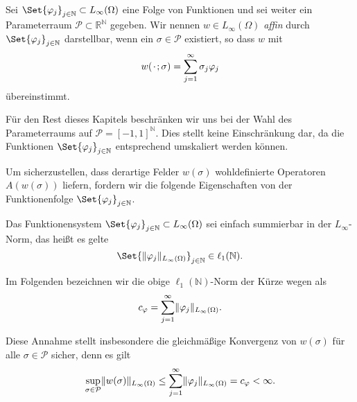 \begin{Definition}
\label{def:ps:pf:omega_affin}
    Sei $\Set{\varphi_{j}}_{j \in \mathbb{N}} \subset L_{\infty}(\Omega)$ eine Folge von Funktionen und sei weiter ein Parameterraum $\mathcal P \subset \mathbb{R}^{\mathbb{N}}$ gegeben.
    Wir nennen $w \in L_{\infty}(\Omega)$ \emph{affin} durch $\Set{\varphi_{j}}_{j \in \mathbb{N}}$ darstellbar, wenn ein $\sigma \in \mathcal P$ existiert, so dass $w$ mit
    \begin{equation}
        w({\mkern2mu\cdot\mkern2mu}; \sigma) = \sum_{j = 1}^{\infty} \sigma_{j} \varphi_{j}
    \end{equation}
    übereinstimmt.
\end{Definition}

\begin{Bemerkung}
    Für den Rest dieses Kapitels beschränken wir uns bei der Wahl des Parameterraums auf $\mathcal P = [-1, 1]^{\mathbb{N}}$.
    Dies stellt keine Einschränkung dar, da die Funktionen $\Set{ \varphi_{j} }_{j \in \mathbb{N}}$ entsprechend umskaliert werden können.
\end{Bemerkung}

Um sicherzustellen, dass derartige Felder $w(\sigma)$ wohldefinierte Operatoren $A(w(\sigma))$ liefern, fordern wir die folgende Eigenschaften von der Funktionenfolge $\Set{\varphi_{j}}_{j \in \mathbb{N}}$.

\begin{Annahme}
    \label{annahme:l1_summierbar}
    Das Funktionensystem $\Set{ \varphi_{j} }_{j \in \mathbb{N}} \subset L_{\infty}(\Omega)$ sei einfach summierbar in der $L_{\infty}$-Norm, das heißt es gelte
    \begin{equation}
        \Set{ \norm{\varphi_{j}}_{L_{\infty}(\Omega) } }_{j \in \mathbb{N}} \in \ell_{1}(\mathbb{N}).
    \end{equation}
\end{Annahme}

Im Folgenden bezeichnen wir die obige $\ell_{1}(\mathbb{N})$-Norm der Kürze wegen als
\begin{equation}
    \label{eq:varphi_l1_norm_konst}
    c_{\varphi} = \sum_{j = 1}^{\infty} \lVert\varphi_{j}\rVert_{L_{\infty}(\Omega)}.
\end{equation}

Diese Annahme stellt insbesondere die gleichmäßige Konvergenz von $w(\sigma)$ für alle $\sigma \in \mathcal P$ sicher, denn es gilt
\begin{equation}
\label{eq:ps:pf:omega_norm_abschaetzung}
    \sup_{\sigma \in \mathcal P} \lVert w(\sigma)\rVert_{L_{\infty}(\Omega)} \leq \sum_{j = 1}^{\infty} \lVert\varphi_{j}\rVert_{L_{\infty}(\Omega)} = c_{\varphi} < \infty.
\end{equation}

